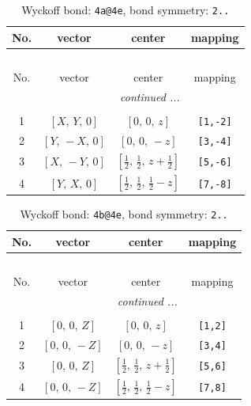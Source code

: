 \documentclass[fleqn,8pt]{jsarticle}
\begin{document}
\begin{longtable}{cccc}
\caption{Wyckoff bond: {\tt 4a@4e}, bond symmetry: {\tt 2..}}
 \\
 \hline \hline
No. & vector & center & mapping \\ \hline \endfirsthead

\multicolumn{3}{l}{\tablename\ \thetable{}} \\
 \hline \hline
No. & vector & center & mapping \\ \hline \endhead

 \hline \hline
\multicolumn{3}{r}{\footnotesize\it continued ...} \\ \endfoot

 \hline \hline
\multicolumn{3}{r}{} \\ \endlastfoot

1 & $\left[ X,\, Y,\, 0 \right]$ & $\left[ 0,\, 0,\, z \right]$ & {\tt [1,-2]} \\ \hline
2 & $\left[ Y,\, - X,\, 0 \right]$ & $\left[ 0,\, 0,\, - z \right]$ & {\tt [3,-4]} \\ \hline
3 & $\left[ X,\, - Y,\, 0 \right]$ & $\left[ \frac{1}{2},\, \frac{1}{2},\, z + \frac{1}{2} \right]$ & {\tt [5,-6]} \\ \hline
4 & $\left[ Y,\, X,\, 0 \right]$ & $\left[ \frac{1}{2},\, \frac{1}{2},\, \frac{1}{2} - z \right]$ & {\tt [7,-8]} \\
\end{longtable}
\renewcommand{\arraystretch}{1.2}
\begin{longtable}{cccc}
\caption{Wyckoff bond: {\tt 4b@4e}, bond symmetry: {\tt 2..}}
 \\
 \hline \hline
No. & vector & center & mapping \\ \hline \endfirsthead

\multicolumn{3}{l}{\tablename\ \thetable{}} \\
 \hline \hline
No. & vector & center & mapping \\ \hline \endhead

 \hline \hline
\multicolumn{3}{r}{\footnotesize\it continued ...} \\ \endfoot

 \hline \hline
\multicolumn{3}{r}{} \\ \endlastfoot

1 & $\left[ 0,\, 0,\, Z \right]$ & $\left[ 0,\, 0,\, z \right]$ & {\tt [1,2]} \\ \hline
2 & $\left[ 0,\, 0,\, - Z \right]$ & $\left[ 0,\, 0,\, - z \right]$ & {\tt [3,4]} \\ \hline
3 & $\left[ 0,\, 0,\, Z \right]$ & $\left[ \frac{1}{2},\, \frac{1}{2},\, z + \frac{1}{2} \right]$ & {\tt [5,6]} \\ \hline
4 & $\left[ 0,\, 0,\, - Z \right]$ & $\left[ \frac{1}{2},\, \frac{1}{2},\, \frac{1}{2} - z \right]$ & {\tt [7,8]} \\
\end{longtable}
\end{document}
